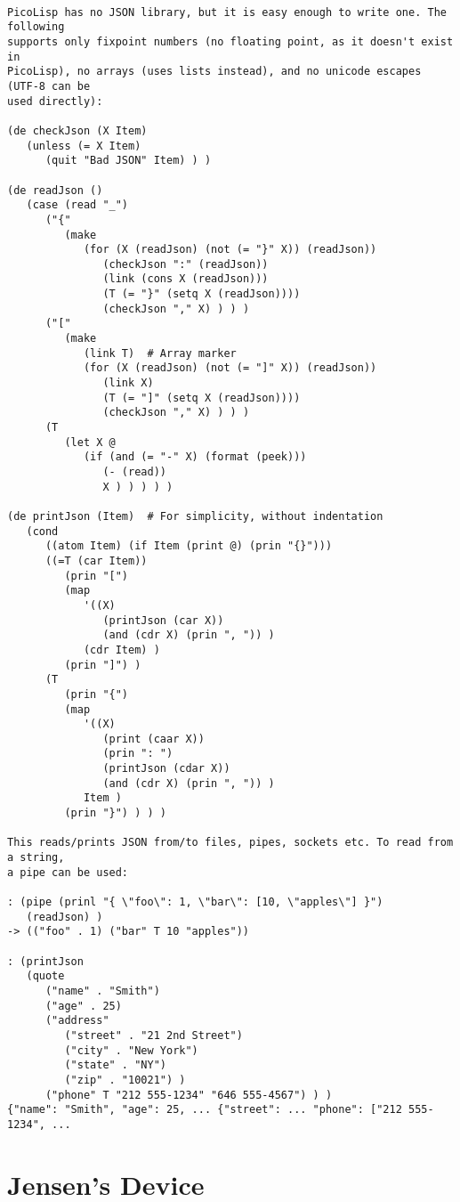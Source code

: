 \begin{verbatim}

PicoLisp has no JSON library, but it is easy enough to write one. The following
supports only fixpoint numbers (no floating point, as it doesn't exist in
PicoLisp), no arrays (uses lists instead), and no unicode escapes (UTF-8 can be
used directly):

(de checkJson (X Item)
   (unless (= X Item)
      (quit "Bad JSON" Item) ) )

(de readJson ()
   (case (read "_")
      ("{"
         (make
            (for (X (readJson) (not (= "}" X)) (readJson))
               (checkJson ":" (readJson))
               (link (cons X (readJson)))
               (T (= "}" (setq X (readJson))))
               (checkJson "," X) ) ) )
      ("["
         (make
            (link T)  # Array marker
            (for (X (readJson) (not (= "]" X)) (readJson))
               (link X)
               (T (= "]" (setq X (readJson))))
               (checkJson "," X) ) ) )
      (T
         (let X @
            (if (and (= "-" X) (format (peek)))
               (- (read))
               X ) ) ) ) )

(de printJson (Item)  # For simplicity, without indentation
   (cond
      ((atom Item) (if Item (print @) (prin "{}")))
      ((=T (car Item))
         (prin "[")
         (map
            '((X)
               (printJson (car X))
               (and (cdr X) (prin ", ")) )
            (cdr Item) )
         (prin "]") )
      (T
         (prin "{")
         (map
            '((X)
               (print (caar X))
               (prin ": ")
               (printJson (cdar X))
               (and (cdr X) (prin ", ")) )
            Item )
         (prin "}") ) ) )

This reads/prints JSON from/to files, pipes, sockets etc. To read from a string,
a pipe can be used:

: (pipe (prinl "{ \"foo\": 1, \"bar\": [10, \"apples\"] }")
   (readJson) )
-> (("foo" . 1) ("bar" T 10 "apples"))

: (printJson
   (quote
      ("name" . "Smith")
      ("age" . 25)
      ("address"
         ("street" . "21 2nd Street")
         ("city" . "New York")
         ("state" . "NY")
         ("zip" . "10021") )
      ("phone" T "212 555-1234" "646 555-4567") ) )
{"name": "Smith", "age": 25, ... {"street": ... "phone": ["212 555-1234", ...

\end{verbatim}

\section*{Jensen's Device}

